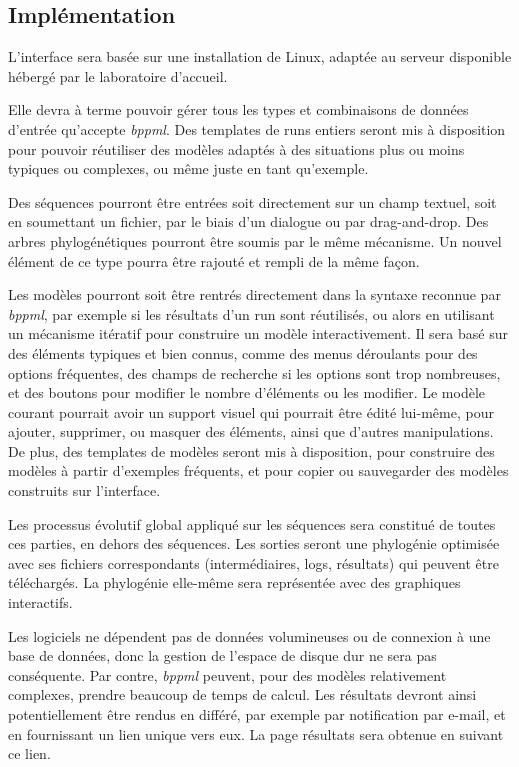\subsection{Implémentation}

L'interface sera basée sur une installation de Linux,
adaptée au serveur disponible hébergé par le laboratoire d'accueil.

Elle devra à terme pouvoir gérer tous les types
et combinaisons de données d'entrée qu'accepte \textit{bppml}.
Des templates de runs entiers seront mis à disposition
pour pouvoir réutiliser des modèles adaptés à des situations
plus ou moins typiques ou complexes,
ou même juste en tant qu'exemple.

Des séquences pourront être entrées soit directement sur un champ textuel,
soit en soumettant un fichier,
par le biais d'un dialogue ou par drag-and-drop.
Des arbres phylogénétiques pourront être soumis par le même mécanisme.
Un nouvel élément de ce type pourra être rajouté et rempli de la même façon.

Les modèles pourront
soit être rentrés directement dans la syntaxe reconnue par \textit{bppml},
par exemple si les résultats d'un run sont réutilisés,
ou alors en utilisant un mécanisme itératif pour construire un modèle interactivement.
Il sera basé sur des éléments typiques et bien connus,
comme des menus déroulants pour des options fréquentes,
des champs de recherche si les options sont trop nombreuses,
et des boutons pour modifier le nombre d'éléments ou les modifier.
Le modèle courant pourrait avoir un support visuel
qui pourrait être édité lui-même,
pour ajouter, supprimer, ou masquer des éléments,
ainsi que d'autres manipulations.
De plus, des templates de modèles seront mis à disposition,
pour construire des modèles à partir d'exemples fréquents,
et pour copier ou sauvegarder des modèles construits sur l'interface.

Les processus évolutif global appliqué sur les séquences
sera constitué de toutes ces parties, en dehors des séquences.
Les sorties seront une phylogénie optimisée
avec ses fichiers correspondants
(intermédiaires, logs, résultats)
qui peuvent être téléchargés.
La phylogénie elle-même sera représentée avec des graphiques interactifs.

Les logiciels ne dépendent pas de données volumineuses
ou de connexion à une base de données,
donc la gestion de l'espace de disque dur ne sera pas conséquente.
Par contre, \textit{bppml} peuvent,
pour des modèles relativement complexes,
prendre beaucoup de temps de calcul.
Les résultats devront ainsi potentiellement
être rendus en différé,
par exemple par notification par e-mail,
et en fournissant un lien unique vers eux.
La page résultats sera obtenue en suivant ce lien.

